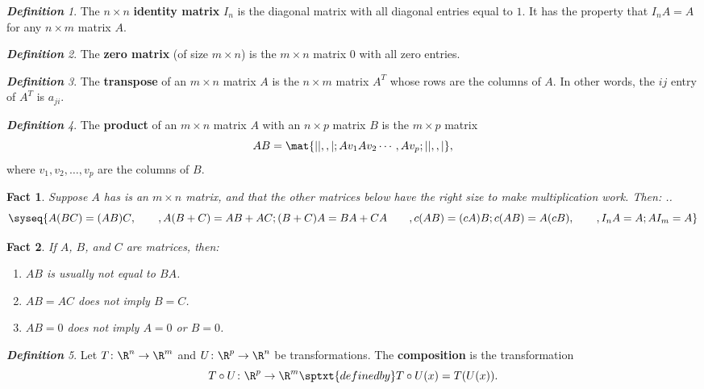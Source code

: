 \documentclass[12pt]{amsart}
\theoremstyle{plain}
\newtheorem*{fact}{Fact}
\theoremstyle{remark}
\newtheorem*{Defn}{\bf Definition}
\begin{document}
\begin{Defn}
  The $n\times n$ \textbf{identity matrix} $I_n$ is the diagonal matrix with all
  diagonal entries equal to $1$.  It has the property that $I_n A = A$ for any
  $n\times m$ matrix $A$.
\end{Defn}

\begin{Defn}
  The \textbf{zero matrix} (of size $m\times n$) is the $m\times n$ matrix $0$
  with all zero entries.
\end{Defn}

\begin{Defn}
  The \textbf{transpose} of an $m\times n$ matrix $A$ is the $n\times m$ matrix
  $A^T$ whose rows are the columns of $A$.  In other words, the $ij$ entry of
  $A^T$ is $a_{ji}$.
\end{Defn}

\begin{Defn}
  The \textbf{\color{red}product} of an $m\times n$ matrix $A$ with an
  $n\times p$ matrix $B$ is the $m\times p$ matrix
  \[ AB = \mat{| | ,, |; Av_1 Av_2 \cdots, Av_p; | | ,, |}, \]
  where $v_1,v_2,\ldots,v_p$ are the columns of $B$.
\end{Defn}

\begin{fact}
  Suppose $A$ has is an $m\times n$ matrix, and that the other matrices below
  have the right size to make multiplication work.  Then:  \spalignsysdelims..
  \[\syseq{A(BC) = (AB)C\hfill, \qquad,
    A(B+C) = AB+AC;
    (B+C)A = BA+CA \qquad,
    c(AB) = (cA)B\hfill ;
    c(AB) = A(cB)\hfill, \qquad,
    I_nA = A\hfill;
    AI_m = A\hfill}
\]
\end{fact}

\begin{fact}
  If $A$, $B$, and $C$ are matrices, then:
  \begin{enumerate}
  \item $AB$ is usually not equal to $BA$.
  \item $AB = AC$ does not imply $B=C$.
  \item $AB=0$ does not imply $A=0$ or $B=0$.
  \end{enumerate}
\end{fact}

\begin{Defn}
  Let $T\colon\R^n\to\R^m$ and $U\colon\R^p\to\R^n$ be transformations.  The
  \textbf{composition} is the transformation
  \[ T\circ U\colon\R^p\to\R^m \sptxt{defined by} T\circ U(x) = T(U(x)). \]
\end{Defn}
\end{document}
